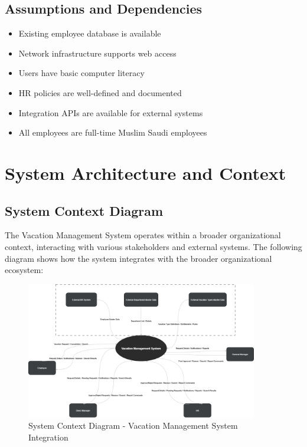 \documentclass[12pt,a4paper]{article}
\begin{document}
\subsection{Assumptions and Dependencies}
\begin{itemize}
    \item Existing employee database is available
    \item Network infrastructure supports web access
    \item Users have basic computer literacy
    \item HR policies are well-defined and documented
    \item Integration APIs are available for external systems
    \item All employees are full-time Muslim Saudi employees
\end{itemize}

\section{System Architecture and Context}

\subsection{System Context Diagram}
The Vacation Management System operates within a broader organizational context, interacting with various stakeholders and external systems. The following diagram shows how the system integrates with the broader organizational ecosystem:

\begin{figure}[H]
\centering
\includegraphics[width=0.9\textwidth]{Diagrams/Context/context.drawio.png}
\caption{System Context Diagram - Vacation Management System Integration}
\label{fig:context}
\end{figure}
\end{document}

